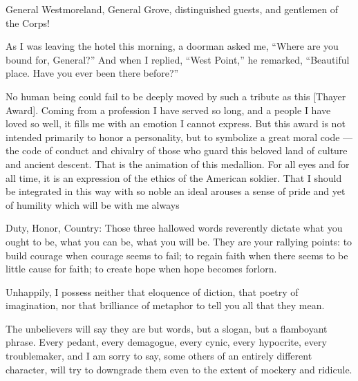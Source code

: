 \documentclass[a4paper]{amsbook}
\begin{document}
\vspace{10 mm}

General Westmoreland, General Grove, distinguished guests, and gentlemen of the Corps!

As I was leaving the hotel this morning, a doorman asked me, “Where are you bound for, General?” And when I replied, “West Point,” he remarked, “Beautiful place. Have you ever been there before?”

No human being could fail to be deeply moved by such a tribute as this [Thayer Award]. Coming from a profession I have served so long, and a people I have loved so well, it fills me with an emotion I cannot express. But this award is not intended primarily to honor a personality, but to symbolize a great moral code — the code of conduct and chivalry of those who guard this beloved land of culture and ancient descent. That is the animation of this medallion. For all eyes and for all time, it is an expression of the ethics of the American soldier. That I should be integrated in this way with so noble an ideal arouses a sense of pride and yet of humility which will be with me always

Duty, Honor, Country: Those three hallowed words reverently dictate what you ought to be, what you can be, what you will be. They are your rallying points: to build courage when courage seems to fail; to regain faith when there seems to be little cause for faith; to create hope when hope becomes forlorn.

Unhappily, I possess neither that eloquence of diction, that poetry of imagination, nor that brilliance of metaphor to tell you all that they mean.

The unbelievers will say they are but words, but a slogan, but a flamboyant phrase. Every pedant, every demagogue, every cynic, every hypocrite, every troublemaker, and I am sorry to say, some others of an entirely different character, will try to downgrade them even to the extent of mockery and ridicule.
\end{document}
